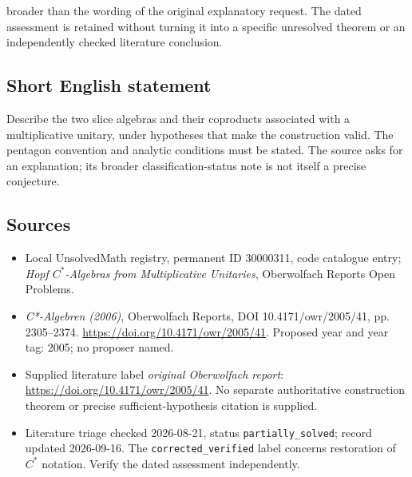 \documentclass[11pt]{article}
\begin{document}
broader than the wording of the original explanatory request. The dated assessment is retained without turning it into a specific unresolved theorem or an independently checked literature conclusion.
\subsection{Short English statement}
Describe the two slice algebras and their coproducts associated with a multiplicative unitary, under hypotheses that make the construction valid. The pentagon convention and analytic conditions must be stated. The source asks for an explanation; its broader classification-status note is not itself a precise conjecture.
\subsection{Sources}
\begin{itemize}\item Local UnsolvedMath registry, permanent ID 30000311, code catalogue entry; \emph{Hopf \(C^*\)-Algebras from Multiplicative Unitaries}, Oberwolfach Reports Open Problems.\item \emph{C*-Algebren (2006)}, Oberwolfach Reports, DOI 10.4171/owr/2005/41, pp. 2305--2374. \url{https://doi.org/10.4171/owr/2005/41}. Proposed year and year tag: 2005; no proposer named.\item Supplied literature label \emph{original Oberwolfach report}: \url{https://doi.org/10.4171/owr/2005/41}. No separate authoritative construction theorem or precise sufficient-hypothesis citation is supplied.\item Literature triage checked 2026-08-21, status \texttt{partially\_solved}; record updated 2026-09-16. The \texttt{corrected\_verified} label concerns restoration of \(C^*\) notation. Verify the dated assessment independently.\end{itemize}
\end{document}

